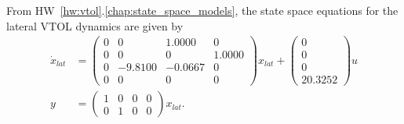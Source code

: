 From HW~\ref{hw:vtol}.\ref{chap:state_space_models}, the state space equations for the lateral VTOL dynamics are given by
\begin{align*}
\dot{x}_{lat} &= \begin{pmatrix}
         0 &        0 &   1.0000 &        0 \\
         0 &        0 &        0 &   1.0000 \\
         0 &  -9.8100 &  -0.0667 &        0 \\
         0 &        0 &        0 &        0
\end{pmatrix} x_{lat} + \begin{pmatrix}
         0 \\
         0 \\
         0 \\
   20.3252
\end{pmatrix} u \\
y &= \begin{pmatrix}
1 & 0 & 0 & 0 \\
0 & 1 & 0 & 0 
\end{pmatrix} x_{lat}.
\end{align*}
